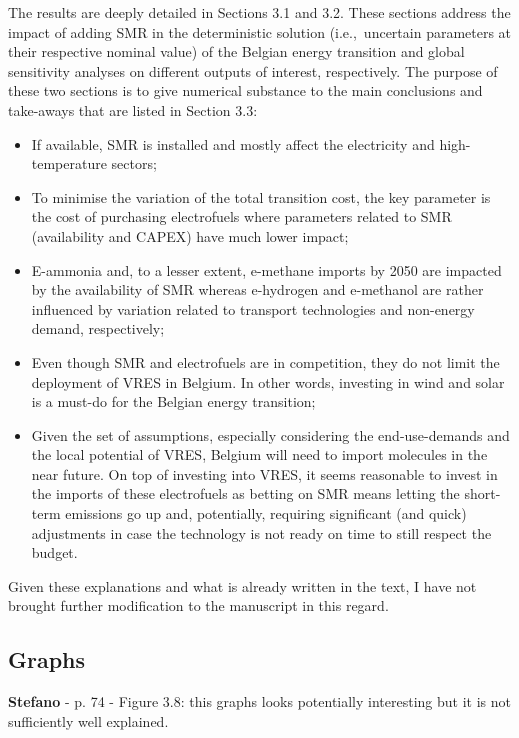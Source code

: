 \documentclass[12pt,a4paper]{article}
\def\ie{i.e.,\ }
\begin{document}
\noindent The results are deeply detailed in Sections 3.1 and 3.2. These sections address the impact of adding SMR in the deterministic solution (\ie uncertain parameters at their respective nominal value) of the Belgian energy transition and global sensitivity analyses on different outputs of interest, respectively.  The purpose of these two sections is to give numerical substance to the main conclusions and take-aways that are listed in Section 3.3:
\begin{itemize}
\item If available, SMR is installed and mostly affect the electricity and high-temperature sectors;
\item To minimise the variation of the total transition cost, the key parameter is the cost of purchasing electrofuels where parameters related to SMR (availability and CAPEX) have much lower impact;
\item E-ammonia and, to a lesser extent, e-methane imports by 2050 are impacted by the availability of SMR whereas e-hydrogen and e-methanol are rather influenced by variation related to transport technologies and non-energy demand, respectively;
\item Even though SMR and electrofuels are in competition, they do not limit the deployment of VRES in Belgium. In other words, investing in wind and solar is a must-do for the Belgian energy transition;
\item Given the set of assumptions, especially considering the end-use-demands and the local potential of VRES, Belgium will need to import molecules in the near future. On top of investing into VRES, it seems reasonable to invest in the imports of these electrofuels as betting on SMR means letting the short-term emissions go up and, potentially, requiring significant (and quick) adjustments in case the technology is not ready on time to still respect the  budget.
\end{itemize}

Given these explanations and what is already written in the text, I have not brought further modification to the manuscript in this regard.

\subsection{Graphs}
\begin{mdframed}[style=comment] %
{\color{orange} \textbf{Stefano}} - p. 74 - Figure 3.8: this graphs looks potentially interesting but it is not sufficiently well explained.
\end{mdframed}
\end{document}
